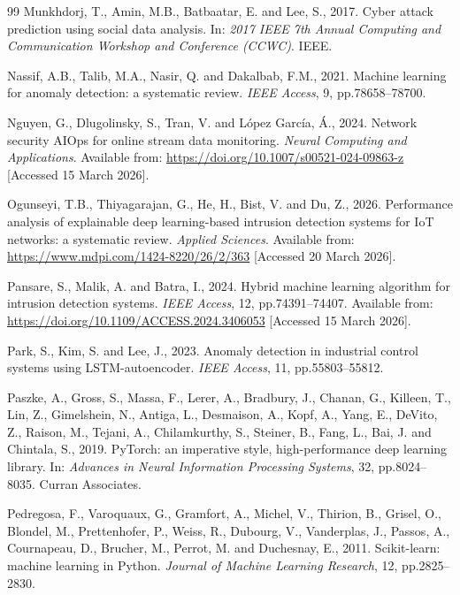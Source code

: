 \documentclass[12pt,a4paper]{report}
\begin{document}
\begin{thebibliography}{99}
Munkhdorj, T., Amin, M.B., Batbaatar, E. and Lee, S., 2017. Cyber attack prediction using social data analysis. In: \textit{2017 IEEE 7th Annual Computing and Communication Workshop and Conference (CCWC)}. IEEE.

Nassif, A.B., Talib, M.A., Nasir, Q. and Dakalbab, F.M., 2021. Machine learning for anomaly detection: a systematic review. \textit{IEEE Access}, 9, pp.78658--78700.

Nguyen, G., Dlugolinsky, S., Tran, V. and L\'{o}pez Garc\'{i}a, \'{A}., 2024. Network security AIOps for online stream data monitoring. \textit{Neural Computing and Applications}. Available from: \url{https://doi.org/10.1007/s00521-024-09863-z} [Accessed 15 March 2026].

Ogunseyi, T.B., Thiyagarajan, G., He, H., Bist, V. and Du, Z., 2026. Performance analysis of explainable deep learning-based intrusion detection systems for IoT networks: a systematic review. \textit{Applied Sciences}. Available from: \url{https://www.mdpi.com/1424-8220/26/2/363} [Accessed 20 March 2026].

Pansare, S., Malik, A. and Batra, I., 2024. Hybrid machine learning algorithm for intrusion detection systems. \textit{IEEE Access}, 12, pp.74391--74407. Available from: \url{https://doi.org/10.1109/ACCESS.2024.3406053} [Accessed 15 March 2026].

Park, S., Kim, S. and Lee, J., 2023. Anomaly detection in industrial control systems using LSTM-autoencoder. \textit{IEEE Access}, 11, pp.55803--55812.

Paszke, A., Gross, S., Massa, F., Lerer, A., Bradbury, J., Chanan, G., Killeen, T., Lin, Z., Gimelshein, N., Antiga, L., Desmaison, A., Kopf, A., Yang, E., DeVito, Z., Raison, M., Tejani, A., Chilamkurthy, S., Steiner, B., Fang, L., Bai, J. and Chintala, S., 2019. PyTorch: an imperative style, high-performance deep learning library. In: \textit{Advances in Neural Information Processing Systems}, 32, pp.8024--8035. Curran Associates.

Pedregosa, F., Varoquaux, G., Gramfort, A., Michel, V., Thirion, B., Grisel, O., Blondel, M., Prettenhofer, P., Weiss, R., Dubourg, V., Vanderplas, J., Passos, A., Cournapeau, D., Brucher, M., Perrot, M. and Duchesnay, E., 2011. Scikit-learn: machine learning in Python. \textit{Journal of Machine Learning Research}, 12, pp.2825--2830.


\end{thebibliography}
\end{document}

